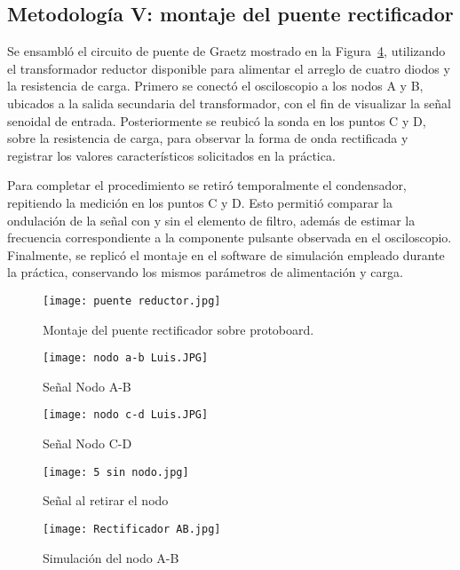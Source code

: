 \documentclass[conference]{IEEEtran} %
\begin{document}
\subsection{Metodología V: montaje del puente rectificador}
Se ensambló el circuito de puente de Graetz mostrado en la Figura~\ref{fig:rectificador-montaje}, utilizando el transformador reductor disponible para alimentar el arreglo de cuatro diodos y la resistencia de carga. Primero se conectó el osciloscopio a los nodos A y B, ubicados a la salida secundaria del transformador, con el fin de visualizar la señal senoidal de entrada. Posteriormente se reubicó la sonda en los puntos C y D, sobre la resistencia de carga, para observar la forma de onda rectificada y registrar los valores característicos solicitados en la práctica.

Para completar el procedimiento se retiró temporalmente el condensador, repitiendo la medición en los puntos C y D. Esto permitió comparar la ondulación de la señal con y sin el elemento de filtro, además de estimar la frecuencia correspondiente a la componente pulsante observada en el osciloscopio. Finalmente, se replicó el montaje en el software de simulación empleado durante la práctica, conservando los mismos parámetros de alimentación y carga. 

\begin{figure}[htbp]
    \centering
    \texttt{[image: puente reductor.jpg]}
    \caption{Montaje del puente rectificador sobre protoboard.}
    \label{fig:rectificador-montaje}
\end{figure}

\begin{figure}[htbp]
    \centering
    \texttt{[image: nodo a-b Luis.JPG]}
    \caption{Señal Nodo A-B}
    \label{fig:rectificador-montaje}
\end{figure}
\begin{figure}[htbp]
    \centering
    \texttt{[image: nodo c-d Luis.JPG]}
    \caption{Señal Nodo C-D}
    \label{fig:rectificador-montaje}
\end{figure}
\begin{figure}[htbp]
    \centering
    \texttt{[image: 5 sin nodo.jpg]}
    \caption{Señal al retirar el nodo}
    \label{fig:rectificador-montaje}
\end{figure}


\begin{figure}[htbp]
    \centering
    \texttt{[image: Rectificador AB.jpg]}
    \caption{Simulación del nodo A-B}
    \label{fig:rectificador-simulacion-ab}
\end{figure}
\end{document}
